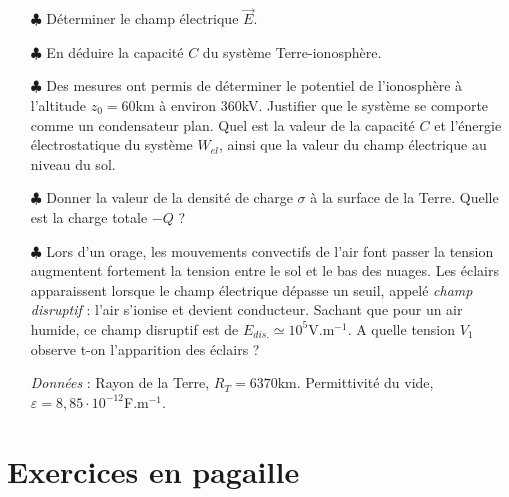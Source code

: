 \documentclass{report}
\begin{document}
\begin{itemize}
	
	\item[$\clubsuit$] Déterminer le champ électrique $\vec{E}$.
		
	\item[$\clubsuit$] En déduire la capacité $C$ du système Terre-ionosphère.
	
	\item[$\clubsuit$] Des mesures ont permis de déterminer le potentiel de l'ionosphère à l'altitude $z_0=60$km à environ 360kV. Justifier que le système se comporte comme un condensateur plan. Quel est la valeur de la capacité $C$ et l'énergie électrostatique du système $W_{el}$, ainsi que la valeur du champ électrique au niveau du sol.
	
	\item[$\clubsuit$] Donner la valeur de la densité de charge $\sigma$ à la surface de la Terre. Quelle est la charge totale $-Q$ ?
	
	\item[$\clubsuit$] Lors d'un orage, les mouvements convectifs de l'air font passer la tension augmentent fortement la tension entre le sol et le bas des nuages. Les éclairs apparaissent lorsque le champ électrique dépasse un seuil, appelé \textit{champ disruptif} : l'air s'ionise et devient conducteur. Sachant que pour un air humide, ce champ disruptif est de $E_{dis.}\simeq10^{5}$V.m$^{-1}$. A quelle tension $V_1$ observe t-on l'apparition des éclairs ?
	
	
	\textit{Données} : Rayon de la Terre, $R_T=6370$km. Permittivité du vide, $\varepsilon=8,85\cdot10^{-12}$F.m$^{-1}$.
	
\end{itemize}

\newpage

\section*{Exercices en pagaille}
\end{document}
